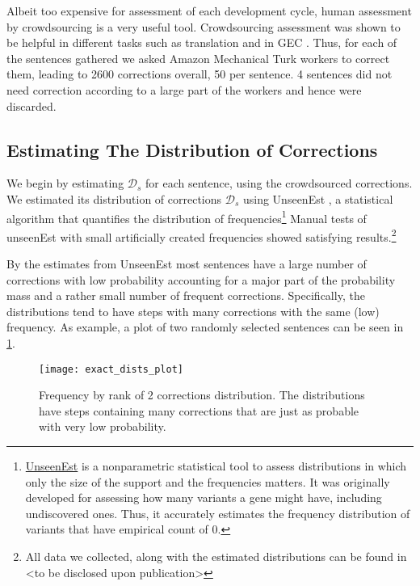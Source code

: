 		Albeit too expensive for assessment of each development cycle, human assessment
		by crowdsourcing is a very useful tool. Crowdsourcing assessment was shown to
		be helpful in different tasks such as translation
		\cite{zaidan2011crowdsourcing,post2012constructing}
		and in GEC \cite{madnani2011they}. %
		Thus, for each of the sentences gathered we asked Amazon Mechanical Turk workers to correct them, leading to 2600 corrections overall,
		50 per sentence. 4 sentences did not need correction according to a large part of the workers and hence were discarded.
		
		\subsection{Estimating The Distribution of Corrections}
		
		We begin by estimating $\mathcal{D}_s$ for each sentence, using the crowdsourced
		corrections. We estimated its distribution of corrections $\mathcal{D}_s$
		using {\sc UnseenEst} \cite{zou2015quantifying}, a statistical algorithm that quantifies
		the distribution of frequencies\footnote{\href{https://github.com/borgr/unseenest}{UnseenEst} is a nonparametric statistical tool to assess distributions in which only the size of the support and the frequencies matters. It was originally developed for assessing how many variants a gene might have, including undiscovered ones. Thus, it accurately estimates the frequency distribution of variants that have empirical count of 0. } Manual tests of unseenEst with small artificially created frequencies showed
		satisfying results.\footnote{All data
			we collected, along with the estimated distributions can be found in <to be disclosed
			upon publication>}
		
		By the estimates from {\sc UnseenEst} most sentences have a large number of corrections with low probability accounting for a major part of the probability mass and a rather small number of frequent corrections. Specifically, the distributions tend to have steps with many corrections with the same (low) frequency. As example, a plot of two randomly selected sentences can be seen in \ref{fig:corrections_dist}.
		
		\begin{figure}
			\texttt{[image: exact\_dists\_plot]}
			\caption{Frequency by rank of 2 corrections distribution. The distributions have steps containing many corrections that are just as probable with very low probability. 	\label{fig:corrections_dist}}
		\end{figure}
		
